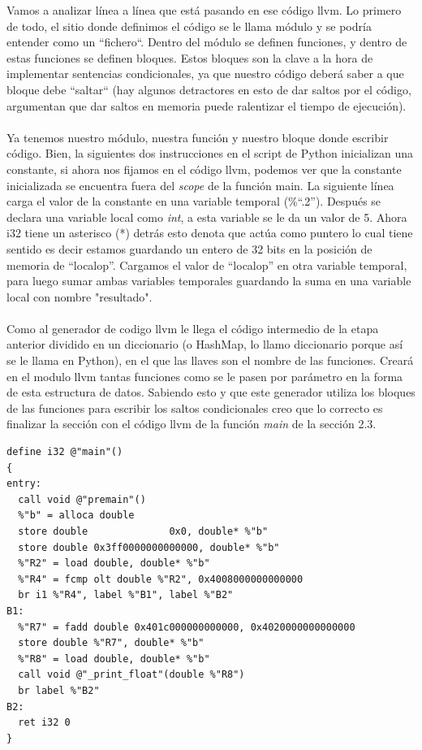 Vamos a analizar línea a línea que está pasando en ese código llvm. Lo primero de todo, el sitio donde definimos el código se le llama módulo y se podría entender como un ``fichero``. Dentro del módulo se definen funciones, y dentro de estas funciones se definen bloques. Estos bloques son la clave a la hora de implementar sentencias condicionales, ya que nuestro código deberá saber a que bloque debe ``saltar`` (hay algunos detractores en esto de dar saltos por el código, argumentan que dar saltos en memoria puede ralentizar el tiempo de ejecución).\\\\ Ya tenemos nuestro módulo, nuestra función y nuestro bloque donde escribir código. Bien, la siguientes dos instrucciones en el script de Python inicializan una constante, si ahora nos fijamos en el código llvm, podemos ver que la constante inicializada se encuentra fuera del \textit{scope} de la función main. La siguiente línea carga el valor de la constante en una variable temporal (\%``.2'').  Después se declara una variable local como \textit{int}, a esta variable se le da un valor de 5. Ahora i32 tiene un asterisco (*) detrás esto denota que actúa como puntero lo cual tiene sentido es decir estamos guardando un entero de 32 bits en la posición de memoria de ``localop''. Cargamos el valor de ``localop'' en otra variable temporal, para luego sumar ambas variables temporales guardando la suma en una variable local con nombre "resultado".
\\\\
Como al generador de codigo llvm le llega el código intermedio de la etapa anterior dividido en un diccionario (o HashMap, lo llamo diccionario porque así se le llama en Python), en el que las llaves son el nombre de las funciones. Creará en el modulo llvm tantas funciones como se le pasen por parámetro en la forma de esta estructura de datos. Sabiendo esto y que este generador utiliza los bloques de las funciones para escribir los saltos condicionales creo que lo correcto es finalizar la sección con el código llvm de la función \textit{main} de la sección 2.3.
\begin{lstlisting}[style=pythonStyle]
define i32 @"main"()
{
entry:
  call void @"premain"()
  %"b" = alloca double
  store double              0x0, double* %"b"
  store double 0x3ff0000000000000, double* %"b"
  %"R2" = load double, double* %"b"
  %"R4" = fcmp olt double %"R2", 0x4008000000000000
  br i1 %"R4", label %"B1", label %"B2"
B1:
  %"R7" = fadd double 0x401c000000000000, 0x4020000000000000
  store double %"R7", double* %"b"
  %"R8" = load double, double* %"b"
  call void @"_print_float"(double %"R8")
  br label %"B2"
B2:
  ret i32 0
}
\end{lstlisting}
